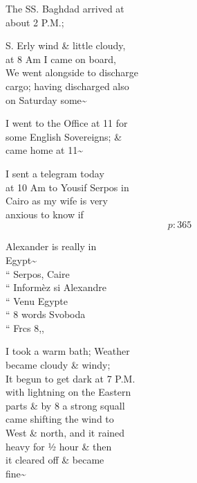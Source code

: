 \documentclass{report}
\begin{document}
	\par{
 	The SS. Baghdad arrived at\ \\about 2 P.M.;\ \\
	}

	\par{
 	S. Erly wind \& little cloudy,\ \\at 8 Am I came on board,\ \\We went alongside to discharge\ \\cargo; having discharged also\ \\on Saturday some\~{}\ \\
	}

	\par{
 	I went to the Office at 11 for\ \\some English Sovereigns; \&\ \\came home at 11\~{}\ \\
	}

	\par{
 	I sent a telegram today\ \\at 10 Am to Yousif Serpos in\ \\Cairo as my wife is very\ \\anxious to know if\ \\
  \[p: 365 \]

	}



	\par{
 	Alexander is really in\ \\Egypt\~{}\ \\“ Serpos, Caire\ \\“ Informèz si Alexandre\ \\“ Venu Egypte\ \\“ 8 words Svoboda\ \\“ Frcs 8,,\ \\
	}

	\par{
 	I took a warm bath; Weather\ \\became cloudy \& windy;\ \\It begun to get dark at 7 P.M.\ \\with lightning on the Eastern\ \\parts \& by 8 a strong squall\ \\came shifting the wind to\ \\West \& north, and it rained\ \\heavy for ½ hour \& then\ \\it cleared off \& became\ \\fine\~{}\ \\
	}
\end{document}

